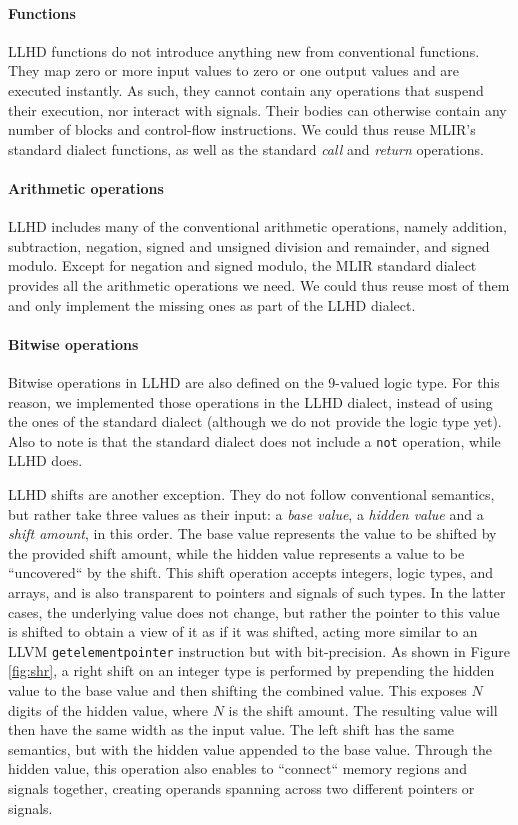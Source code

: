 \paragraph{Functions}
LLHD functions do not introduce anything new from conventional functions. They map zero or more input values to zero or one output values and are executed instantly. As such, they cannot contain any operations that suspend their execution, nor interact with signals. Their bodies can otherwise contain any number of blocks and control-flow instructions. We could thus reuse MLIR's standard dialect functions, as well as the standard \textit{call} and \textit{return} operations.

\paragraph{Arithmetic operations}
LLHD includes many of the conventional arithmetic operations, namely addition, subtraction, negation, signed and unsigned division and remainder, and signed modulo. Except for negation and signed modulo, the MLIR standard dialect provides all the arithmetic operations we need. We could thus reuse most of them and only implement the missing ones as part of the LLHD dialect.

\paragraph{Bitwise operations}
Bitwise operations in LLHD are also defined on the 9-valued logic type. For this reason, we implemented those operations in the LLHD dialect, instead of using the ones of the standard dialect (although we do not provide the logic type yet). Also to note is that the standard dialect does not include a \texttt{not} operation, while LLHD does.

LLHD shifts are another exception. They do not follow conventional semantics, but rather take three values as their input: a \textit{base value}, a \textit{hidden value} and a \textit{shift amount}, in this order. The base value represents the value to be shifted by the provided shift amount, while the hidden value represents a value to be “uncovered“ by the shift. This shift operation accepts integers, logic types, and arrays, and is also transparent to pointers and signals of such types. In the latter cases, the underlying value does not change, but rather the pointer to this value is shifted to obtain a view of it as if it was shifted, acting more similar to an LLVM \texttt{getelementpointer} instruction but with bit-precision. As shown in Figure \ref{fig:shr}, a right shift on an integer type is performed by prepending the hidden value to the base value and then shifting the combined value. This exposes $N$ digits of the hidden value, where $N$ is the shift amount. The resulting value will then have the same width as the input value. The left shift has the same semantics, but with the hidden value appended to the base value.
Through the hidden value, this operation also enables to “connect“ memory regions and signals together, creating operands spanning across two different pointers or signals.

